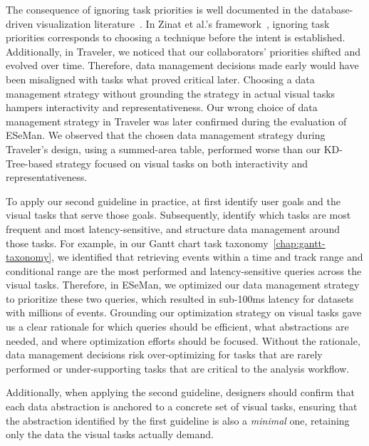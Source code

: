 \begin{refsection}
The consequence of ignoring task priorities is well documented in the database-driven visualization literature~\cite{battle2020structured, battle2019role, zinat2023comparative}. In Zinat et al.'s framework~\cite{zinat2024multi}, ignoring task priorities corresponds to choosing a technique before the intent is established. Additionally, in Traveler, we noticed that our collaborators' priorities shifted and evolved over time. Therefore, data management decisions made early would have been misaligned with tasks what proved critical later. Choosing a data management strategy without grounding the strategy in actual visual tasks hampers interactivity and representativeness. Our wrong choice of data management strategy in Traveler was later confirmed during the evaluation of ESeMan. We observed that the chosen data management strategy during Traveler's design, using a summed-area table, performed worse than our KD-Tree-based strategy focused on visual tasks on both interactivity and representativeness.

To apply our second guideline in practice, at first identify user goals and the visual tasks that serve those goals. Subsequently, identify which tasks are most frequent and most latency-sensitive, and structure data management around those tasks. For example, in our Gantt chart task taxonomy~\autoref{chap:gantt-taxonomy}, we identified that retrieving events within a time and track range and conditional range are the most performed and latency-sensitive queries across the visual tasks. Therefore, in ESeMan, we optimized our data management strategy to prioritize these two queries, which resulted in sub-100ms latency for datasets with millions of events. Grounding our optimization strategy on visual tasks gave us a clear rationale for which queries should be efficient, what abstractions are needed, and where optimization efforts should be focused. Without the rationale, data management decisions risk over-optimizing for tasks that are rarely performed or under-supporting tasks that are critical to the analysis workflow.

Additionally, when applying the second guideline, designers should confirm that each data abstraction is anchored to a concrete set of visual tasks, ensuring that the abstraction identified by the first guideline is also a \emph{minimal} one, retaining only the data the visual tasks actually demand.

\printbibliography[heading=subbibnumbered]
\end{refsection}